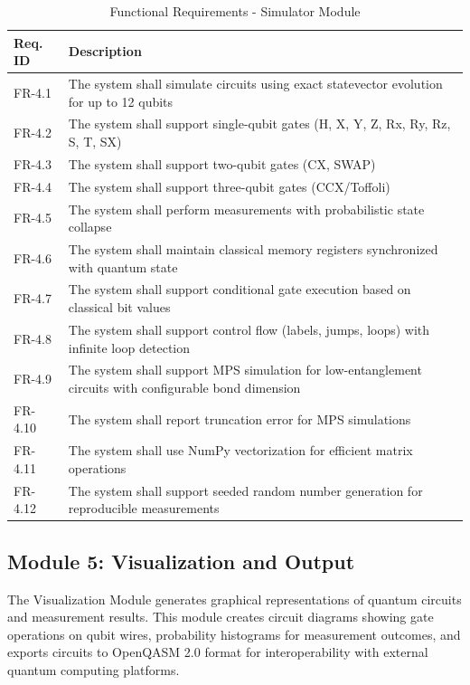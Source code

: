 \begin{table}[H]
\centering
\caption{Functional Requirements - Simulator Module}
\begin{tabular}{|p{2cm}|p{11cm}|}
\hline
\textbf{Req. ID} & \textbf{Description} \\
\hline
FR-4.1 & The system shall simulate circuits using exact statevector evolution for up to 12 qubits \\
\hline
FR-4.2 & The system shall support single-qubit gates (H, X, Y, Z, Rx, Ry, Rz, S, T, SX) \\
\hline
FR-4.3 & The system shall support two-qubit gates (CX, SWAP) \\
\hline
FR-4.4 & The system shall support three-qubit gates (CCX/Toffoli) \\
\hline
FR-4.5 & The system shall perform measurements with probabilistic state collapse \\
\hline
FR-4.6 & The system shall maintain classical memory registers synchronized with quantum state \\
\hline
FR-4.7 & The system shall support conditional gate execution based on classical bit values \\
\hline
FR-4.8 & The system shall support control flow (labels, jumps, loops) with infinite loop detection \\
\hline
FR-4.9 & The system shall support MPS simulation for low-entanglement circuits with configurable bond dimension \\
\hline
FR-4.10 & The system shall report truncation error for MPS simulations \\
\hline
FR-4.11 & The system shall use NumPy vectorization for efficient matrix operations \\
\hline
FR-4.12 & The system shall support seeded random number generation for reproducible measurements \\
\hline
\end{tabular}
\end{table}

\subsection{Module 5: Visualization and Output}

The Visualization Module generates graphical representations of quantum circuits and measurement results. This module creates circuit diagrams showing gate operations on qubit wires, probability histograms for measurement outcomes, and exports circuits to OpenQASM 2.0 format for interoperability with external quantum computing platforms.

